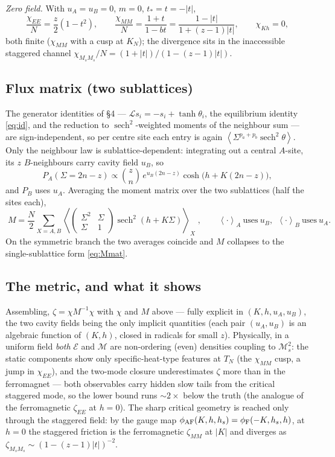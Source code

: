 \documentclass[11pt]{article}
\newcommand{\sech}{\operatorname{sech}}
\newcommand{\eq}{\mathcal{E}}
\newcommand{\mg}{\mathcal{M}}
\newcommand{\ms}{\mathcal{M}_s}
\newcommand{\LL}{\mathcal{L}}
\newcommand{\avg}[1]{\left\langle #1 \right\rangle}
\newcommand{\Sig}{\Sigma}
\begin{document}
\emph{Zero field.} With $u_A=u_B=0$, $m=0$, $t_*=t=-|t|$,
\begin{equation}
\frac{\chi_{EE}}N=\frac z2(1-t^2),\qquad
\frac{\chi_{MM}}N=\frac{1+t}{1-bt}=\frac{1-|t|}{1+(z-1)|t|},\qquad
\chi_{Kh}=0,
\end{equation}
both finite ($\chi_{MM}$ with a cusp at $K_N$); the divergence sits in the inaccessible staggered
channel $\chi_{M_sM_s}/N=(1+|t|)/(1-(z-1)|t|)$.

\subsection{Flux matrix (two sublattices)}
The generator identities of \S4 --- $\LL s_i=-s_i+\tanh\theta_i$, the equilibrium identity
\eqref{eq:id}, and the reduction to $\sech^2$-weighted moments of the neighbour sum --- are
sign-independent, so per centre site each entry is again $\avg{\Sig^{p_a+p_b}\sech^2\theta}$. Only the
neighbour law is sublattice-dependent: integrating out a central $A$-site, its $z$ $B$-neighbours carry
cavity field $u_B$, so
\begin{equation}
P_A(\Sig=2n{-}z)\propto\binom{z}{n}\,e^{u_B(2n-z)}\cosh\!\big(h+K(2n{-}z)\big),
\end{equation}
and $P_B$ uses $u_A$. Averaging the moment matrix over the two sublattices (half the sites each),
\begin{equation}
\boxed{\;M=\frac N2\!\!\sum_{X=A,B}\!\left\langle\begin{pmatrix}\Sig^2&\Sig\\\Sig&1\end{pmatrix}
\sech^2(h{+}K\Sig)\right\rangle_{\!X}\;},\qquad
\avg{\cdot}_A\ \text{uses}\ u_B,\ \ \avg{\cdot}_B\ \text{uses}\ u_A.
\end{equation}
On the symmetric branch the two averages coincide and $M$ collapses to the single-sublattice form
\eqref{eq:Mmat}.

\subsection{The metric, and what it shows}
Assembling, $\zeta=\chi M^{-1}\chi$ with $\chi$ and $M$ above --- fully explicit in $(K,h,u_A,u_B)$, the
two cavity fields being the only implicit quantities (each pair $(u_A,u_B)$ is an algebraic function of
$(K,h)$, closed in radicals for small $z$). Physically, in a uniform field \emph{both} $\eq$ and $\mg$
are non-ordering (even) densities coupling to $\ms^2$: the static components show only
specific-heat-type features at $T_N$ (the $\chi_{MM}$ cusp, a jump in $\chi_{EE}$), and the two-mode
closure underestimates $\zeta$ more than in the ferromagnet --- both observables carry hidden slow tails
from the critical staggered mode, so the lower bound runs $\sim2\times$ below the truth (the analogue of
the ferromagnetic $\zeta_{EE}$ at $h=0$). The sharp critical geometry is reached only through the
staggered field: by the gauge map $\phi_{\rm AF}(K,h,h_s)=\phi_{\rm F}(-K,h_s,h)$, at $h=0$ the staggered
friction is the ferromagnetic $\zeta_{MM}$ at $|K|$ and diverges as $\zeta_{M_sM_s}\sim(1-(z-1)|t|)^{-2}$.
\end{document}
